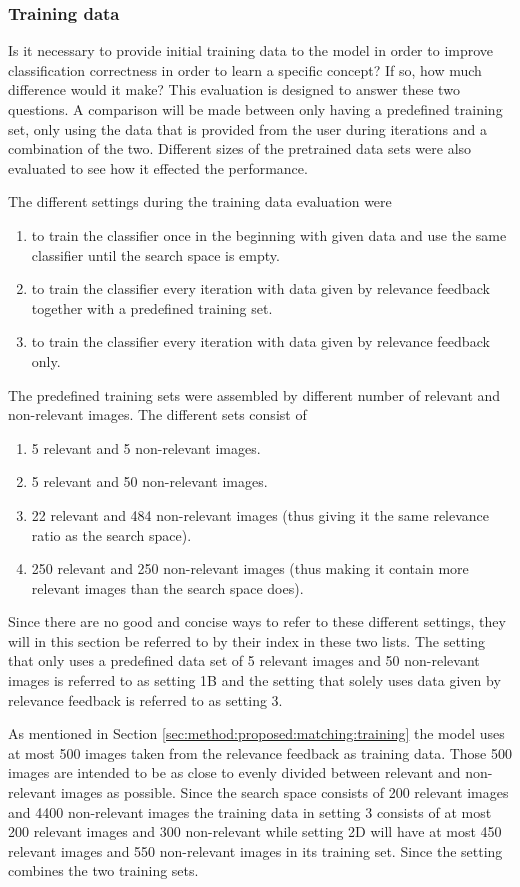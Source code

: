 \subsubsection{Training data}
\label{sec:method:eval:param:training}

Is it necessary to provide initial training data to the model in order to improve classification correctness in order to learn a specific concept? If so, how much difference would it make? This evaluation is designed to answer these two questions. A comparison will be made between only having a predefined training set, only using the data that is provided from the user during iterations and a combination of the two. Different sizes of the pretrained data sets were also evaluated to see how it effected the performance.

The different settings during the training data evaluation were 
\begin{enumerate}
	\item to train the classifier once in the beginning with given data and use the same classifier until the search space is empty. 
	\item to train the classifier every iteration with data given by relevance feedback together with a predefined training set. 
	\item to train the classifier every iteration with data given by relevance feedback only.
\end{enumerate}
\medskip
The predefined training sets were assembled by different number of relevant and non-relevant images. The different sets consist of
\begin{enumerate}[label=\Alph*.]
	\item 5 relevant and 5 non-relevant images.
	\item 5 relevant and 50 non-relevant images.
	\item 22 relevant and 484 non-relevant images (thus giving it the same relevance ratio as the search space).
	\item 250 relevant and 250 non-relevant images (thus making it contain more relevant images than the search space does).
\end{enumerate}
\medskip
Since there are no good and concise ways to refer to these different settings, they will in this section be referred to by their index in these two lists. The setting that only uses a predefined data set of 5 relevant images and 50 non-relevant images is referred to as setting 1B and the setting that solely uses data given by relevance feedback is referred to as setting 3.

As mentioned in Section \ref{sec:method:proposed:matching:training} the model uses at most 500 images taken from the relevance feedback as training data. Those 500 images are intended to be as close to evenly divided between relevant and non-relevant images as possible. Since the search space consists of 200 relevant images and 4400 non-relevant images the training data in setting 3 consists of at most 200 relevant images and 300 non-relevant while setting 2D will have at most 450 relevant images and 550 non-relevant images in its training set. 
Since the setting combines the two training sets.